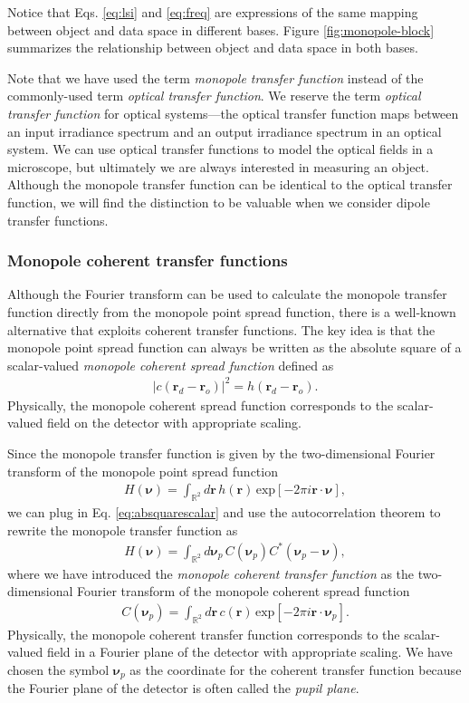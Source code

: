 \documentclass[]{osa-article}
\providecommand{\mb}[1]{\mathbf{#1}}
\providecommand{\ro}{\mathbf{\mathbf{r}}_o}
\providecommand{\rd}{\mathbf{r}_d}
\providecommand{\mbb}[1]{\mathbb{#1}}
\providecommand{\bs}[1]{\boldsymbol{#1}}
\providecommand{\bv}{\bs{\nu}}
\providecommand{\bvp}{\bs{\nu}_p}
\begin{document}
Notice that Eqs. \ref{eq:lsi} and \ref{eq:freq} are expressions of the same
mapping between object and data space in different bases. Figure
\ref{fig:monopole-block} summarizes the relationship between object and data
space in both bases.

Note that we have used the term \textit{monopole transfer function} instead of
the commonly-used term \textit{optical transfer function}. We reserve the term
\textit{optical transfer function} for optical systems---the optical transfer
function maps between an input irradiance spectrum and an output irradiance
spectrum in an optical system. We can use optical transfer functions to model
the optical fields in a microscope, but ultimately we are always interested in
measuring an object. Although the monopole transfer function can be identical to
the optical transfer function, we will find the distinction to be valuable when
we consider dipole transfer functions.

\subsubsection{Monopole coherent transfer functions}
Although the Fourier transform can be used to calculate the monopole transfer
function directly from the monopole point spread function, there is a well-known
alternative that exploits coherent transfer functions. The key idea is that the
monopole point spread function can always be written as the absolute square of a
scalar-valued \textit{monopole coherent spread function} defined as
\begin{align}
  |c(\rd - \ro)|^2 = h(\rd - \ro). \label{eq:absquarescalar}
\end{align}
Physically, the monopole coherent spread function corresponds to the
scalar-valued field on the detector with appropriate scaling.

Since the monopole transfer function is given by the two-dimensional Fourier
transform of the monopole point spread function
\begin{align}
  H(\bv) = \int_{\mbb{R}^2}d\mb{r}\,h(\mb{r})\,\text{exp}[-2\pi i\mb{r}\cdot\bv],
\end{align}
we can plug in Eq. \ref{eq:absquarescalar} and use the autocorrelation theorem to
rewrite the monopole transfer function as
\begin{align}
  H(\bv) = \int_{\mbb{R}^2}d\bvp\, C(\bvp)C^*(\bvp - \bv), 
\end{align}
where we have introduced the
\textit{monopole coherent transfer function} as the two-dimensional Fourier
transform of the monopole coherent spread function
\begin{align}
  C(\bvp) = \int_{\mbb{R}^2}d\mb{r}\, c(\mb{r})\,\text{exp}[-2\pi i\mb{r}\cdot\bvp].
\end{align}
Physically, the monopole coherent transfer function corresponds to the
scalar-valued field in a Fourier plane of the detector with appropriate scaling.
We have chosen the symbol $\bvp$ as the coordinate for the coherent
transfer function because the Fourier plane of the detector is often called the
\textit{pupil plane}.
\end{document}
